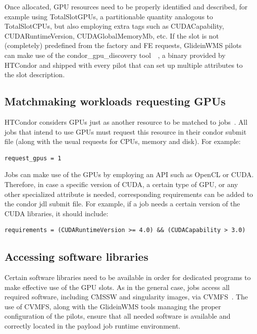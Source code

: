 \documentclass{webofc}
\begin{document}
Once allocated, GPU resources need to be properly identified and described, for example using TotalSlotGPUs, a partitionable quantity analogous to TotalSlotCPUs, but also employing extra tags such as CUDACapability, CUDARuntimeVersion, CUDAGlobalMemoryMb, etc. If the slot is not (completely) predefined from the factory and FE requests, GlideinWMS pilots can make use of the condor\_gpu\_discovery tool~\cite{gpu_discover1}~\cite{gpu_discover2}, a binary provided by HTCondor and shipped with every pilot that can set up multiple attributes to the slot description.


\subsection{Matchmaking workloads requesting GPUs} 
HTCondor considers GPUs just as another resource to be matched to jobs~\cite{gpu_condor}. All jobs that intend to use GPUs must request this resource in their condor submit file (along with the usual requests for CPUs, memory and disk). For example:

\begin{verbatim}
request_gpus = 1
\end{verbatim}

Jobs can make use of the GPUs by employing an API such as OpenCL or CUDA. Therefore, in case a specific version of CUDA, a certain type of GPU, or any other specialized attribute is needed, corresponding requirements can be added to the condor jdl submit file. For example, if a job needs a certain version of the CUDA libraries, it should include:
\begin{verbatim}
requirements = (CUDARuntimeVersion >= 4.0) && (CUDACapability > 3.0)
\end{verbatim}

\subsection{Accessing software libraries}
Certain software libraries need to be available in order for dedicated programs to make effective use of the GPU slots. As in the general case, jobs access all required software, including CMSSW and singularity images, via CVMFS~\cite{cvmfs}. The use of CVMFS, along with the GlideinWMS tools managing the proper configuration of the pilots, ensure that all needed software is available and correctly located in the payload job runtime environment. 
\end{document}
